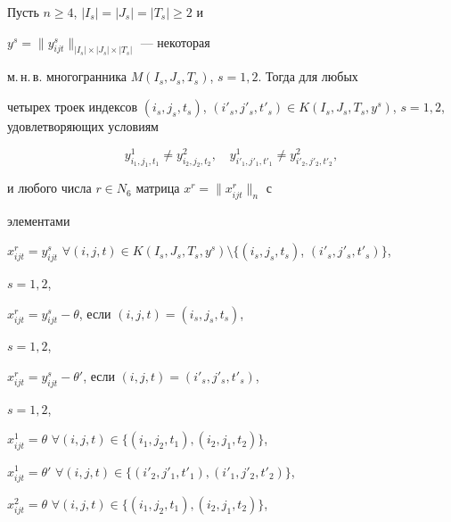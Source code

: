 \begin{lem}


Пусть $n\geq 4$, $|I_s|=|J_s|=|T_s|\geq 2$ и


$y^s=\|y_{ijt}^s\|_{|I_s|\times |J_s|\times |T_s|}$ --- некоторая


м.\,н.\,в. многогранника $M(I_s,J_s,T_s)$, $s=1,2$. Тогда для любых


четырех троек индексов $(i_s,j_s,t_s)$, $(i'_s,j'_s,t'_s)\in


K(I_s,J_s,T_s,y^s)$, $s=1,2$, удовлетворяющих условиям


\begin{equation}


\label{math/1} y_{i_1,j_1,t_1}^1 \neq y_{i_2,j_2,t_2}^2,\quad


y_{i'_1,j'_1,t'_1}^1 \neq y_{i'_2,j'_2,t'_2}^2,


\end{equation}


и любого числа $r\in N_6$ матрица $x^r=\|x^r_{ijt}\|_n$ с


элементами





$x_{ijt}^r=y_{ijt}^s$ $\forall (i,j,t)\in


K(I_s,J_s,T_s,y^s)\setminus \{(i_s,j_s,t_s)$, $(i'_s,j'_s,t'_s)\}$,


$s=1,2$,





$x_{ijt}^r=y_{ijt}^s-\theta$, если $(i,j,t)=(i_s,j_s,t_s)$,


$s=1,2$,





$x_{ijt}^r=y_{ijt}^s-\theta'$, если $(i,j,t)=(i'_s,j'_s,t'_s)$,


$s=1,2$,





$x_{ijt}^1=\theta$ $\forall (i,j,t)\in


\{(i_1,j_2,t_1),(i_2,j_1,t_2)\}$,





$x_{ijt}^1=\theta'$ $\forall (i,j,t)\in


\{(i'_2,j'_1,t'_1),(i'_1,j'_2,t'_2)\}$,





$x_{ijt}^2=\theta$ $\forall (i,j,t)\in


\{(i_1,j_2,t_1),(i_2,j_1,t_2)\}$,






\end{lem}
